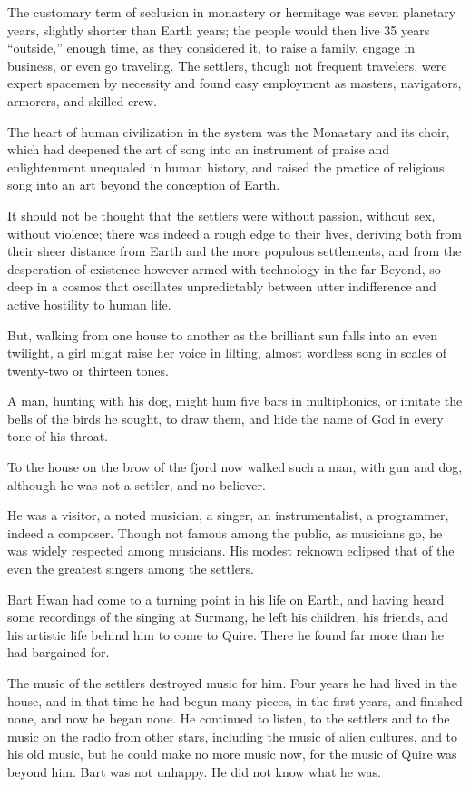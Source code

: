 \documentclass[english,11pt,letterpaper,onecolumn]{scrbook}
\begin{document}
	The customary term of seclusion in monastery or hermitage was seven planetary years, slightly shorter than Earth years; the people would then live 35 years ``outside,'' enough time, as they considered it, to raise a family, engage in business, or even go traveling. The settlers, though not frequent travelers, were expert spacemen by necessity and found easy employment as masters, navigators, armorers, and skilled crew.

	The heart of human civilization in the system was the Monastary and its choir, which had deepened the art of song into an instrument of praise and enlightenment unequaled in human history, and raised the practice of religious song into an art beyond the conception of Earth.

	It should not be thought that the settlers were without passion, without sex, without violence; there was indeed a rough edge to their lives, deriving both from their sheer distance from Earth and the more populous settlements, and from the desperation of existence however armed with technology in the far Beyond, so deep in a cosmos that oscillates unpredictably between utter indifference and active hostility to human life. 

	But, walking from one house to another as the brilliant sun falls into an even twilight, a girl might raise her voice in lilting, almost wordless song in scales of twenty-two or thirteen tones. 

	A man, hunting with his dog, might hum five bars in multiphonics, or imitate the bells of the birds he sought, to draw them, and hide the name of God in every tone of his throat.

	To the house on the brow of the fjord now walked such a man, with gun and dog, although he was not a settler, and no believer.

	He was a visitor, a noted musician, a singer, an instrumentalist, a programmer, indeed a composer. Though not famous among the public, as musicians go, he was widely respected among musicians. His modest reknown eclipsed that of the even the greatest singers among the settlers.

	Bart Hwan had come to a turning point in his life on Earth, and having heard some recordings of the singing at Surmang, he left his children, his friends, and his artistic life behind him to come to Quire. There he found far more than he had bargained for. 

	The music of the settlers destroyed music for him. Four years he had lived in the house, and in that time he had begun many pieces,  in the first years, and finished none, and now he began none. He continued to listen, to the settlers and to the music on the radio from other stars, including the music of alien cultures, and to his old music, but he could make no more music now, for the music of Quire was beyond him. Bart was not unhappy. He did not know what he was. 
\end{document}
